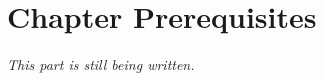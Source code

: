 \addtocounter{section}{-1}
\section{Chapter Prerequisites}
\prereqIntro

\emph{This part is still being written.}

\clearpage
